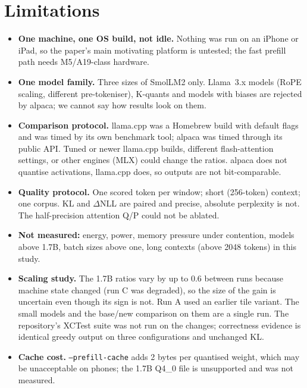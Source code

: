 \documentclass[10pt,twocolumn]{article}
\begin{document}
\section{Limitations}
\begin{itemize}\setlength\itemsep{0pt}
\item \textbf{One machine, one OS build, not idle.} Nothing was run on an iPhone or iPad, so the paper's main motivating platform is untested; the fast prefill path needs M5/A19-class hardware.
\item \textbf{One model family.} Three sizes of SmolLM2 only. Llama~3.x models (RoPE scaling, different pre-tokeniser), K-quants and models with biases are rejected by alpaca; we cannot say how results look on them.
\item \textbf{Comparison protocol.} llama.cpp was a Homebrew build with default flags and was timed by its own benchmark tool; alpaca was timed through its public API. Tuned or newer llama.cpp builds, different flash-attention settings, or other engines (MLX) could change the ratios. alpaca does not quantise activations, llama.cpp does, so outputs are not bit-comparable.
\item \textbf{Quality protocol.} One scored token per window; short (256-token) context; one corpus. KL and $\Delta$NLL are paired and precise, absolute perplexity is not. The half-precision attention Q/P could not be ablated.
\item \textbf{Not measured:} energy, power, memory pressure under contention, models above 1.7B, batch sizes above one, long contexts (above 2048 tokens) in this study.
\item \textbf{Scaling study.} The 1.7B ratios vary by up to 0.6 between runs because machine state changed (run C was degraded), so the size of the gain is uncertain even though its sign is not. Run A used an earlier tile variant. The small models and the base/new comparison on them are a single run. The repository's XCTest suite was not run on the changes; correctness evidence is identical greedy output on three configurations and unchanged KL.
\item \textbf{Cache cost.} \texttt{--prefill-cache} adds 2 bytes per quantised weight, which may be unacceptable on phones; the 1.7B Q4\_0 file is unsupported and was not measured.
\end{itemize}
\end{document}
